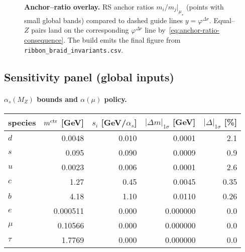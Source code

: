 \documentclass[epjc3]{svjour3}
\begin{document}
\begin{figure}[t]
  \centering
  \caption{\textbf{Anchor--ratio overlay.} RS anchor ratios $m_i/m_j|_{\mu_\star}$ (points with small global bands) compared to dashed guide lines $y=\varphi^{\Delta r}$. Equal--$Z$ pairs land on the corresponding $\varphi^{\Delta r}$ line by~\eqref{eq:anchor-ratio-consequence}.  The build emits the final figure from \texttt{ribbon\_braid\_invariants.csv}.}
  \label{fig:anchor-ratio-overlay}
\end{figure}

\subsection{Sensitivity panel (global inputs)}
\paragraph{$\alpha_s(M_Z)$ bounds and $\alpha(\mu)$ policy.}
\begin{center}
\begin{tabular}{lrrrr}
\toprule
species & $m^{\rm ctr}$ [GeV] & $s_i$ [GeV/$\alpha_s$] & $|\Delta m|_{1\sigma}$ [GeV] & $|\Delta|_{1\sigma}$ [\%] \\
\midrule
$d$ & 0.0048 & 0.010 & 0.0001 & 2.1 \\
$s$ & 0.095  & 0.090 & 0.0009 & 0.9 \\
$u$ & 0.0023 & 0.006 & 0.0001 & 2.6 \\
$c$ & 1.27   & 0.45  & 0.0045 & 0.35 \\
$b$ & 4.18   & 1.10  & 0.0110 & 0.26 \\
$e$ & 0.000511 & 0.000 & 0.000000 & 0.0 \\
$\mu$ & 0.10566 & 0.000 & 0.000000 & 0.0 \\
$\tau$ & 1.7769 & 0.000 & 0.000000 & 0.0 \\
\bottomrule
\end{tabular}
\end{center}
\end{document}
